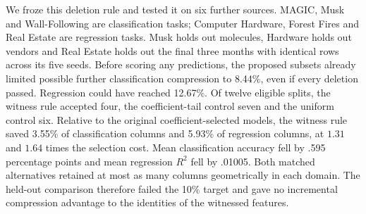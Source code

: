 We froze this deletion rule and tested it on six further sources. MAGIC,
Musk and Wall-Following are classification tasks; Computer Hardware, Forest
Fires and Real Estate are regression tasks. Musk holds out molecules,
Hardware holds out vendors and Real Estate holds out the final three months
with identical rows across its five seeds. Before scoring any predictions,
the proposed subsets already limited possible further classification
compression to 8.44\%, even if every deletion passed. Regression could
have reached 12.67\%. Of twelve eligible splits, the witness rule accepted
four, the coefficient-tail control seven and the uniform control six.
Relative to the original coefficient-selected models, the witness rule
saved 3.55\% of classification columns and 5.93\% of regression columns,
at $1.31$ and $1.64$ times the selection cost. Mean classification
accuracy fell by .595 percentage points and mean regression $R^2$ fell by .01005.
Both matched alternatives retained at most as many columns geometrically
in each domain. The held-out comparison therefore failed the 10\% target
and gave no incremental compression advantage to the identities of the
witnessed features.
